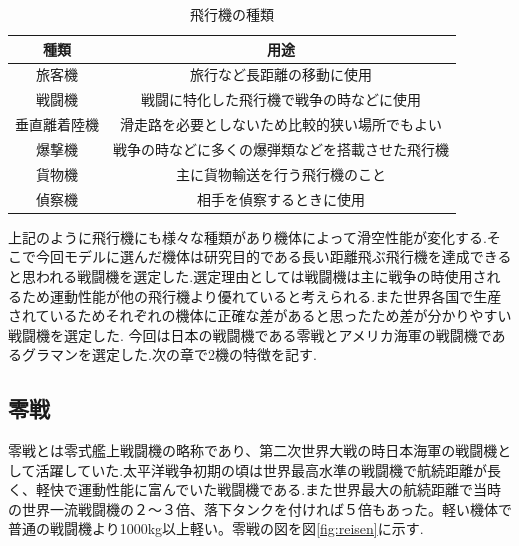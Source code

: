 \begin{table}[H]
 \begin{center}
   \caption{飛行機の種類}
   \begin{tabular}[htbp]{|c|c|}
    \hline
    種類&用途 \\
    \hline
    旅客機&旅行など長距離の移動に使用\\
    \hline
    戦闘機&戦闘に特化した飛行機で戦争の時などに使用\\
    \hline
    垂直離着陸機&滑走路を必要としないため比較的狭い場所でもよい\\
    \hline
    爆撃機&戦争の時などに多くの爆弾類などを搭載させた飛行機\\
    \hline
    貨物機&主に貨物輸送を行う飛行機のこと\\
    \hline
    偵察機&相手を偵察するときに使用\\
    \hline
    
    \end{tabular}
   \label{tab:airplane}
  \end{center}
\end{table}

上記のように飛行機にも様々な種類があり機体によって滑空性能が変化する.そこで今回モデルに選んだ機体は研究目的である長い距離飛ぶ飛行機を達成できると思われる戦闘機を選定した.選定理由としては戦闘機は主に戦争の時使用されるため運動性能が他の飛行機より優れていると考えられる.また世界各国で生産されているためそれぞれの機体に正確な差があると思ったため差が分かりやすい戦闘機を選定した.
今回は日本の戦闘機である零戦とアメリカ海軍の戦闘機であるグラマンを選定した.次の章で2機の特徴を記す.

\subsection{零戦}
零戦とは零式艦上戦闘機の略称であり、第二次世界大戦の時日本海軍の戦闘機として活躍していた.太平洋戦争初期の頃は世界最高水準の戦闘機で航続距離が長く、軽快で運動性能に富んでいた戦闘機である.また世界最大の航続距離で当時の世界一流戦闘機の２～３倍、落下タンクを付ければ５倍もあった。軽い機体で普通の戦闘機より1000kg以上軽い。零戦の図を図\ref{fig:reisen}に示す.

